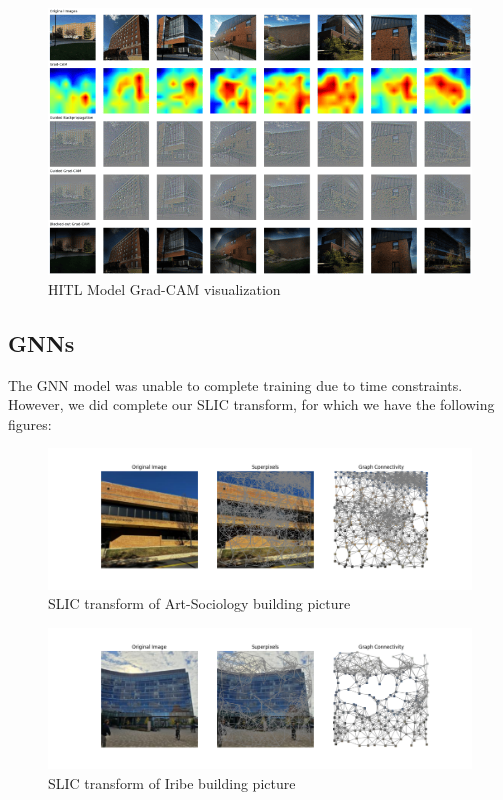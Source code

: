\documentclass{article}
\begin{document}
\begin{figure}[H]
    \centering
    \includegraphics[width=0.8\linewidth]{hitl.png}
    \caption{HITL Model Grad-CAM visualization}
    \label{fig:hitl_results}
\end{figure}

\subsection{GNNs}

The GNN model was unable to complete training due to time constraints. However, we did complete our SLIC transform, for which we have the following figures:

\begin{figure}[H]
    \centering
    \includegraphics[width=0.8\linewidth]{slic_1.png}
    \caption{SLIC transform of Art-Sociology building picture}
    \label{fig:slic1}
\end{figure}

\begin{figure}[H]
    \centering
    \includegraphics[width=0.8\linewidth]{slic_2.png}
    \caption{SLIC transform of Iribe building picture}
    \label{fig:slic2}
\end{figure}
\end{document}
